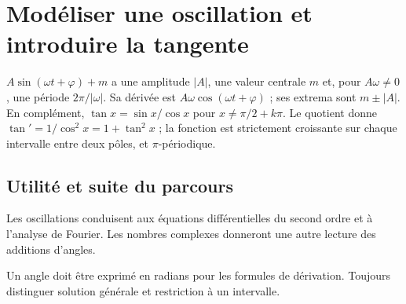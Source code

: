 \documentclass[../cours_tle.tex]{subfiles}
\begin{document}
\section{Modéliser une oscillation et introduire la tangente}
$A\sin(\omega t+\varphi)+m$ a une amplitude $|A|$, une valeur centrale $m$ et, pour $A\omega\ne0$, une période $2\pi/|\omega|$.
Sa dérivée est $A\omega\cos(\omega t+\varphi)$ ; ses extrema sont $m\pm|A|$.
En complément, $\tan x=\sin x/\cos x$ pour $x\ne\pi/2+k\pi$. Le quotient donne $\tan'=1/\cos^2x=1+\tan^2x$ ; la fonction est strictement croissante sur chaque intervalle entre deux pôles, et $\pi$-périodique.
\begin{finchapitre}
\section{Utilité et suite du parcours}
Les oscillations conduisent aux équations différentielles du second ordre et à l'analyse de Fourier. Les nombres complexes donneront une autre lecture des additions d'angles.
\begin{retenir}
Un angle doit être exprimé en radians pour les formules de dérivation. Toujours distinguer solution générale et restriction à un intervalle.
\end{retenir}
\end{finchapitre}
\end{document}
